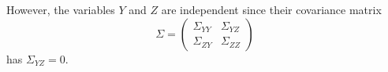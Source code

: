 
However, the variables $ Y$ and $ Z$ are independent since their covariance matrix 
\[
    \Sigma = \begin{pmatrix}
	\Sigma_{YY} & \Sigma_{YZ} \\
	\Sigma_{ZY} & \Sigma_{ZZ} 
    \end{pmatrix}
\] 
has $ \Sigma_{YZ} = 0$.
